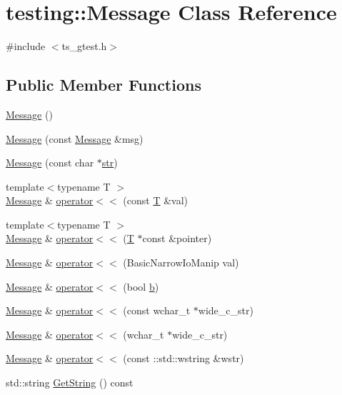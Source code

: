 \hypertarget{classtesting_1_1Message}{\section{testing\-:\-:Message Class Reference}
\label{classtesting_1_1Message}
}


{\ttfamily \#include $<$ts\-\_\-gtest.\-h$>$}

\subsection*{Public Member Functions}
\begin{DoxyCompactItemize}
\item 
\hyperlink{classtesting_1_1Message_af5ba7216630df9845f18feb64b1a5383}{Message} ()
\item 
\hyperlink{classtesting_1_1Message_ac126e24804817a053bebba0920d94a11}{Message} (const \hyperlink{classtesting_1_1Message}{Message} \&msg)
\item 
\hyperlink{classtesting_1_1Message_a9de694ca239486809fc99fbbea8ac21d}{Message} (const char $\ast$\hyperlink{core__c_8h_a5f3a65d240411b0018990ff992b348c0}{str})
\item 
{\footnotesize template$<$typename T $>$ }\\\hyperlink{classtesting_1_1Message}{Message} \& \hyperlink{classtesting_1_1Message_a2e0e71be52d54c20a75a55fca812721f}{operator$<$$<$} (const \hyperlink{calib3d_8hpp_a3efb9551a871ddd0463079a808916717}{T} \&val)
\item 
{\footnotesize template$<$typename T $>$ }\\\hyperlink{classtesting_1_1Message}{Message} \& \hyperlink{classtesting_1_1Message_aa3ab685879958f90d2d8cd5b68d10c34}{operator$<$$<$} (\hyperlink{calib3d_8hpp_a3efb9551a871ddd0463079a808916717}{T} $\ast$const \&pointer)
\item 
\hyperlink{classtesting_1_1Message}{Message} \& \hyperlink{classtesting_1_1Message_a3a71a1c1c8ea52de5852d75483d41453}{operator$<$$<$} (Basic\-Narrow\-Io\-Manip val)
\item 
\hyperlink{classtesting_1_1Message}{Message} \& \hyperlink{classtesting_1_1Message_a3e1e04f23b1bdfe18adfd59928296346}{operator$<$$<$} (bool \hyperlink{legacy_8hpp_ac04272e8ca865b8fba18d36edae9fd2a}{b})
\item 
\hyperlink{classtesting_1_1Message}{Message} \& \hyperlink{classtesting_1_1Message_a34774e225944cb6df02db9689d312aae}{operator$<$$<$} (const wchar\-\_\-t $\ast$wide\-\_\-c\-\_\-str)
\item 
\hyperlink{classtesting_1_1Message}{Message} \& \hyperlink{classtesting_1_1Message_aae57eefb3a72a19c11453d630b1d846c}{operator$<$$<$} (wchar\-\_\-t $\ast$wide\-\_\-c\-\_\-str)
\item 
\hyperlink{classtesting_1_1Message}{Message} \& \hyperlink{classtesting_1_1Message_a0feb54e52c1c27786ad67e93d4356774}{operator$<$$<$} (const \-::std\-::wstring \&wstr)
\item 
std\-::string \hyperlink{classtesting_1_1Message_abe8c1b7584aa670dd0e2413e8317a937}{Get\-String} () const 
\end{DoxyCompactItemize}


